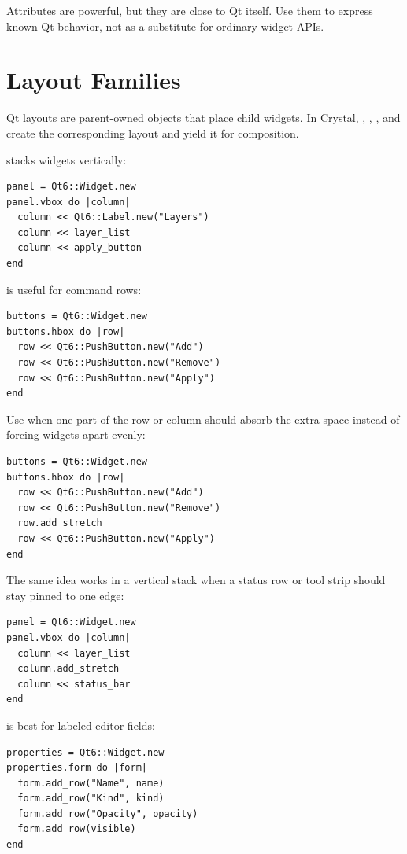 Attributes are powerful, but they are close to Qt itself. Use them to express known Qt behavior, not as a substitute for ordinary widget APIs.

\section{Layout Families}

Qt layouts are parent-owned objects that place child widgets. In Crystal, , , , and  create the corresponding layout and yield it for composition.

 stacks widgets vertically:

\begin{lstlisting}[style=crystal]
panel = Qt6::Widget.new
panel.vbox do |column|
  column << Qt6::Label.new("Layers")
  column << layer_list
  column << apply_button
end
\end{lstlisting}

 is useful for command rows:

\begin{lstlisting}[style=crystal]
buttons = Qt6::Widget.new
buttons.hbox do |row|
  row << Qt6::PushButton.new("Add")
  row << Qt6::PushButton.new("Remove")
  row << Qt6::PushButton.new("Apply")
end
\end{lstlisting}

Use  when one part of the row or column should absorb the extra space instead of forcing widgets apart evenly:

\begin{lstlisting}[style=crystal]
buttons = Qt6::Widget.new
buttons.hbox do |row|
  row << Qt6::PushButton.new("Add")
  row << Qt6::PushButton.new("Remove")
  row.add_stretch
  row << Qt6::PushButton.new("Apply")
end
\end{lstlisting}

The same idea works in a vertical stack when a status row or tool strip should stay pinned to one edge:

\begin{lstlisting}[style=crystal]
panel = Qt6::Widget.new
panel.vbox do |column|
  column << layer_list
  column.add_stretch
  column << status_bar
end
\end{lstlisting}

 is best for labeled editor fields:

\begin{lstlisting}[style=crystal]
properties = Qt6::Widget.new
properties.form do |form|
  form.add_row("Name", name)
  form.add_row("Kind", kind)
  form.add_row("Opacity", opacity)
  form.add_row(visible)
end
\end{lstlisting}

